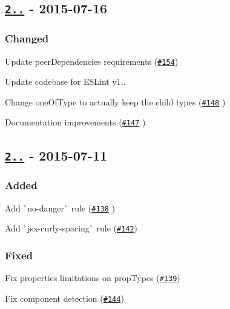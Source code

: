 \subsection*{\href{https://github.com/yannickcr/eslint-plugin-react/compare/v2.7.0...v2.7.1}{\tt 2..} -\/ 2015-\/07-\/16}

\subsubsection*{Changed}


\begin{DoxyItemize}
\item Update peer\+Dependencies requirements (\href{https://github.com/yannickcr/eslint-plugin-react/issues/154}{\tt \#154})
\item Update codebase for E\+S\+Lint v1..
\item Change one\+Of\+Type to actually keep the child types (\href{https://github.com/yannickcr/eslint-plugin-react/issues/148}{\tt \#148} )
\item Documentation improvements (\href{https://github.com/yannickcr/eslint-plugin-react/pull/147}{\tt \#147} )
\end{DoxyItemize}

\subsection*{\href{https://github.com/yannickcr/eslint-plugin-react/compare/v2.6.4...v2.7.0}{\tt 2..} -\/ 2015-\/07-\/11}

\subsubsection*{Added}


\begin{DoxyItemize}
\item Add \`{}no-\/danger\`{} rule (\href{https://github.com/yannickcr/eslint-plugin-react/pull/138}{\tt \#138} )
\item Add \`{}jsx-\/curly-\/spacing\`{} rule (\href{https://github.com/yannickcr/eslint-plugin-react/issues/142}{\tt \#142})
\end{DoxyItemize}

\subsubsection*{Fixed}


\begin{DoxyItemize}
\item Fix properties limitations on prop\+Types (\href{https://github.com/yannickcr/eslint-plugin-react/issues/139}{\tt \#139})
\item Fix component detection (\href{https://github.com/yannickcr/eslint-plugin-react/issues/144}{\tt \#144})
\end{DoxyItemize}

